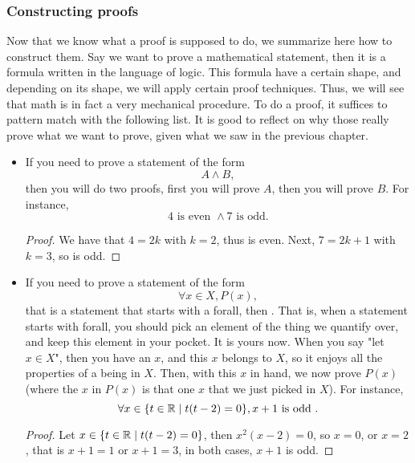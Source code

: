 \subsubsection{Constructing proofs}

Now that we know what a proof is supposed to do, we summarize here how to construct them. Say we want to prove a mathematical statement, then it is a formula written in the language of logic. This formula have a certain shape, and depending on its shape, we will apply certain proof techniques. Thus, we will see that math is in fact a very mechanical procedure. To do a proof, it suffices to pattern match with the following list. It is good to reflect on why those really prove what we want to prove, given what we saw in the previous chapter.

\begin{itemize}
    \item If you need to prove a statement of the form
        \begin{equation*}
           A \land B,
        \end{equation*}
        then you will do two proofs, first you will prove \( A \), then you will prove \( B \). For instance,
        \begin{equation*}
            4 \text{ is even } \land 7 \text{ is odd}.
        \end{equation*}
        \begin{proof}
            We have that \( 4 = 2 k \) with \( k = 2 \), thus is even. Next, \( 7 = 2k + 1 \) with \( k = 3 \), so is odd.
        \end{proof}

    \item If you need to prove a statement of the form
        \begin{equation*}
            \forall x \in X, P(x),
        \end{equation*}
        that is a statement that starts with a forall, then . That is, when a statement starts with forall, you should pick an element of the thing we quantify over, and keep this element in your pocket. It is yours now. When you say "let \( x \in X \)", then you have an \( x \), and this \( x \) belongs to \( X \), so it enjoys all the properties of a being in \( X \). Then, with this \( x \) in hand, we now prove \( P(x) \) (where the \( x \) in \( P(x) \) is that one \( x \) that we just picked in \( X \)). For instance,
        \begin{equation*}
            \forall x \in \{ t \in \mathbb{R} \mid t(t - 2) = 0\}, x + 1 \text{ is odd }. 
        \end{equation*}
        \begin{proof}
            Let \( x \in \{ t \in \mathbb{R} \mid t(t - 2) = 0\} \), then \( x^2(x - 2) = 0 \), so \( x = 0 \), or \( x = 2 \), that is \( x + 1 = 1 \) or \( x + 1 = 3 \), in both cases, \( x + 1 \) is odd.
        \end{proof}


\end{itemize}
